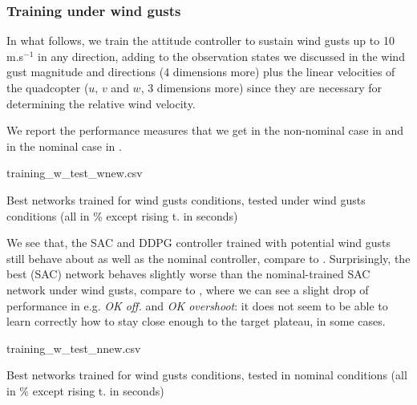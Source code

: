 \documentclass[anonymous=true,format=sigconf, screen=true, review=false]{acmart}
\begin{document}
\subsubsection{Training under wind gusts}

In what follows, we train the attitude controller to sustain wind gusts up to 10 m.s$^{-1}$ in any direction, 
adding to the observation states we discussed in  the wind gust magnitude and directions (4 dimensions more) plus the linear velocities of the quadcopter ($u$, $v$ and $w$, 3 dimensions more) since they are necessary for determining the relative wind velocity. %

We report the performance measures that we get in the non-nominal case in  and in the nominal case in .
\begin{csvtable*}{training_w_test_wnew.csv}
\caption{Best networks trained for wind gusts conditions, tested under wind gusts conditions (all in \% except rising t. in seconds)}
\label{table:windnonnomnonnom}
\end{csvtable*}

We see that, the SAC and DDPG controller trained with potential wind gusts still behave about as well as the nominal controller, compare  to . Surprisingly, the best (SAC) network behaves slightly worse than the nominal-trained SAC network under wind gusts, compare  to , where we can see a slight drop of performance in e.g. {\em OK off.} and {\em OK overshoot}: it does not seem to be able to learn correctly how to stay close enough to the target plateau, in some cases. %

\begin{csvtable*}[h!]{training_w_test_nnew.csv}
\caption{Best networks trained for wind gusts conditions, tested in nominal conditions (all in \% except rising t. in seconds)}
\label{table:windnonnomnom}
\end{csvtable*}
\end{document}
